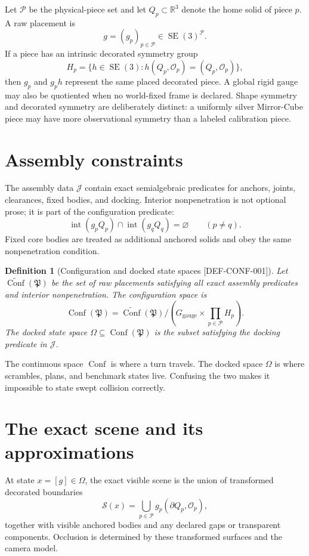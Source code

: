 \documentclass[11pt,openany]{book}
\newcommand{\R}{\mathbb R}
\newcommand{\SE}{\operatorname{SE}}
\newcommand{\Conf}{\operatorname{Conf}}
\newcommand{\Int}{\operatorname{int}}
\newcommand{\Atlas}{\mathfrak P}
\newcommand{\Pieces}{\mathscr P}
\newcommand{\States}{\Omega}
\newcommand{\claimid}[1]{\textnormal{\sffamily\footnotesize[#1]}}
\theoremstyle{polyplain}
\theoremstyle{polydef}
\newtheorem{definition}[theorem]{Definition}
\begin{document}
Let $\Pieces$ be the physical-piece set and let $Q_p\subset\R^3$ denote the home solid of piece $p$. A raw placement is
\[
g=(g_p)_{p\in\Pieces}\in\SE(3)^{\Pieces}.
\]
If a piece has an intrinsic decorated symmetry group
\[
H_p=\{h\in\SE(3):h(Q_p,\mathcal O_p)=(Q_p,\mathcal O_p)\},
\]
then $g_p$ and $g_ph$ represent the same placed decorated piece. A global rigid gauge may also be quotiented when no world-fixed frame is declared. Shape symmetry and decorated symmetry are deliberately distinct: a uniformly silver Mirror-Cube piece may have more observational symmetry than a labeled calibration piece.

\section{Assembly constraints}
\label{sec:configuration-space}

The assembly data $\mathcal J$ contain exact semialgebraic predicates for anchors, joints, clearances, fixed bodies, and docking. Interior nonpenetration is not optional prose; it is part of the configuration predicate:
\[
\Int(g_pQ_p)\cap\Int(g_qQ_q)=\varnothing
\qquad(p\ne q).
\]
Fixed core bodies are treated as additional anchored solids and obey the same nonpenetration condition.

\begin{definition}[Configuration and docked state spaces \claimid{DEF-CONF-001}]
\label{def:configuration-space}
Let $\widetilde{\Conf}(\Atlas)$ be the set of raw placements satisfying all exact assembly predicates and interior nonpenetration. The \emph{configuration space} is
\[
\Conf(\Atlas)=\widetilde{\Conf}(\Atlas)\big/\left(G_{\mathrm{gauge}}\times\prod_{p\in\Pieces}H_p\right).
\]
The \emph{docked state space} $\States\subseteq\Conf(\Atlas)$ is the subset satisfying the docking predicate in $\mathcal J$.
\end{definition}

The continuous space $\Conf$ is where a turn travels. The docked space $\States$ is where scrambles, plans, and benchmark states live. Confusing the two makes it impossible to state swept collision correctly.

\section{The exact scene and its approximations}

At state $x=[g]\in\States$, the exact visible scene is the union of transformed decorated boundaries
\[
\mathcal S(x)=\bigcup_{p\in\Pieces}g_p(\partial Q_p,\mathcal O_p),
\]
together with visible anchored bodies and any declared gaps or transparent components. Occlusion is determined by these transformed surfaces and the camera model.
\end{document}
